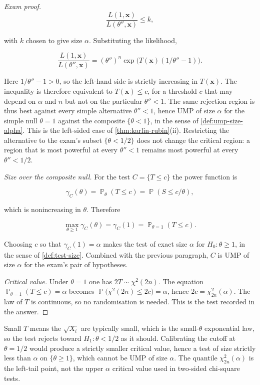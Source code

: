 \documentclass[11pt,a4paper]{article}
\DeclareMathOperator{\Pbb}{\mathbb{P}}
\begin{document}
\begin{proof}[Exam proof]
\[
\frac{L(1,\mathbf{x})}{L(\theta'',\mathbf{x})}
\le
k,
\]

with \(k\) chosen to give size \(\alpha\). Substituting the likelihood,

\[
\frac{L(1,\mathbf{x})}{L(\theta'',\mathbf{x})}
=
(\theta'')^{n}
\exp\bigl(T(\mathbf{x})(1/\theta''-1)\bigr).
\]

Here \(1/\theta''-1>0\), so the left-hand side is strictly increasing in \(T(\mathbf{x})\). The inequality is therefore equivalent to \(T(\mathbf{x})\le c\), for a threshold \(c\) that may depend on \(\alpha\) and \(n\) but not on the particular \(\theta''<1\). The same rejection region is thus best against every simple alternative \(\theta''<1\), hence UMP of size \(\alpha\) for the simple null \(\theta=1\) against the composite \(\{\theta<1\}\), in the sense of \cref{def:ump-size-alpha}. This is the left-sided case of \cref{thm:karlin-rubin}(ii). Restricting the alternative to the exam's subset \(\{\theta<1/2\}\) does not change the critical region: a region that is most powerful at every \(\theta''<1\) remains most powerful at every \(\theta''<1/2\).

\emph{Size over the composite null.}
For the test \(C=\{T\le c\}\) the power function is

\[
\gamma_C(\theta)
=
\Pbb_{\theta}(T\le c)
=
\Pbb(S\le c/\theta),
\]

which is nonincreasing in \(\theta\). Therefore

\[
\max_{\theta\ge 1}\gamma_C(\theta)
=
\gamma_C(1)
=
\Pbb_{\theta=1}(T\le c).
\]

Choosing \(c\) so that \(\gamma_C(1)=\alpha\) makes the test of exact size \(\alpha\) for \(H_0:\theta\ge 1\), in the sense of \cref{def:test-size}. Combined with the previous paragraph, \(C\) is UMP of size \(\alpha\) for the exam's pair of hypotheses.

\emph{Critical value.}
Under \(\theta=1\) one has \(2T\sim\chi^{2}(2n)\). The equation \(\Pbb_{\theta=1}(T\le c)=\alpha\) becomes \(\Pbb\bigl(\chi^{2}(2n)\le 2c\bigr)=\alpha\), hence \(2c=\chi^{2}_{2n}(\alpha)\). The law of \(T\) is continuous, so no randomisation is needed. This is the test recorded in the answer.
\end{proof}

\begin{remark}
\label{rem:p7-checks}
Small \(T\) means the \(\sqrt{X_i}\) are typically small, which is the small-\(\theta\) exponential law, so the test rejects toward \(H_1:\theta<1/2\) as it should. Calibrating the cutoff at \(\theta=1/2\) would produce a strictly smaller critical value, hence a test of size strictly less than \(\alpha\) on \(\{\theta\ge 1\}\), which cannot be UMP of size \(\alpha\). The quantile \(\chi^{2}_{2n}(\alpha)\) is the left-tail point, not the upper \(\alpha\) critical value used in two-sided chi-square tests.
\end{remark}
\end{document}
